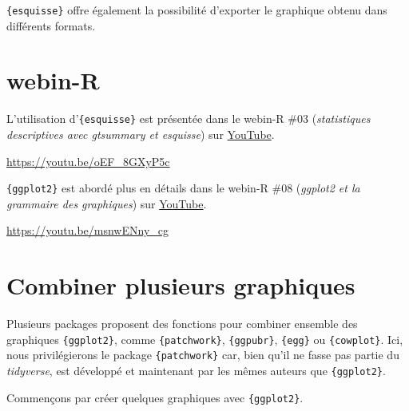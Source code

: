 \documentclass[
  letterpaper,
  DIV=11,
  numbers=noendperiod,
  oneside]{scrreprt}
\begin{document}
\texttt{\{esquisse\}} offre également la possibilité d'exporter le
graphique obtenu dans différents formats.

\hypertarget{webin-r-4}{%
\section{webin-R}\label{webin-r-4}}

L'utilisation d'\texttt{\{esquisse\}} est présentée dans le webin-R \#03
(\emph{statistiques descriptives avec gtsummary et esquisse}) sur
\href{https://youtu.be/oEF_8GXyP5c?t=2620}{YouTube}.

\url{https://youtu.be/oEF_8GXyP5c}

\texttt{\{ggplot2\}} est abordé plus en détails dans le webin-R \#08
(\emph{ggplot2 et la grammaire des graphiques}) sur
\href{https://youtu.be/msnwENny_cg}{YouTube}.

\url{https://youtu.be/msnwENny_cg}

\hypertarget{combiner-plusieurs-graphiques}{%
\section{Combiner plusieurs
graphiques}\label{combiner-plusieurs-graphiques}}

Plusieurs packages proposent des fonctions pour combiner ensemble des
graphiques \texttt{\{ggplot2\}}, comme \texttt{\{patchwork\}},
\texttt{\{ggpubr\}}, \texttt{\{egg\}} ou \texttt{\{cowplot\}}. Ici, nous
privilégierons le package \texttt{\{patchwork\}} car, bien qu'il ne
fasse pas partie du \emph{tidyverse}, est développé et maintenant par
les mêmes auteurs que \texttt{\{ggplot2\}}.

Commençons par créer quelques graphiques avec \texttt{\{ggplot2\}}.
\end{document}
